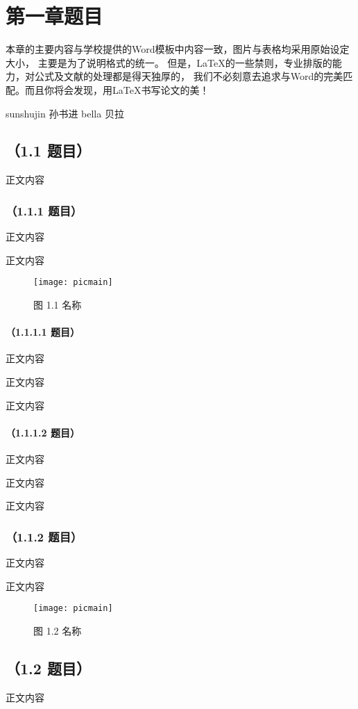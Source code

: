 \chapter{第一章题目}

本章的主要内容与学校提供的Word模板中内容一致，图片与表格均采用原始设定大小，%
主要是为了说明格式的统一。%
但是，\LaTeX{}的一些禁则，专业排版的能力，对公式及文献的处理都是得天独厚的，%
我们不必刻意去追求与Word的完美匹配。而且你将会发现，用\LaTeX{}书写论文的美！ %

sunshujin 孙书进
bella 贝拉

\section{（1.1 题目）}
正文内容

\subsection{（1.1.1 题目）}
正文内容

正文内容

\begin{figure}[htp]
\centering
\texttt{[image: picmain]}
\caption{图 1.1 名称}
\end{figure}

\subsubsection{（1.1.1.1 题目）}
正文内容

正文内容

正文内容

\subsubsection{（1.1.1.2 题目）}
正文内容

正文内容

正文内容

\subsection{（1.1.2 题目）}
正文内容

正文内容

\begin{figure}[htp]
\centering
\texttt{[image: picmain]}
\caption{图 1.2 名称}
\end{figure}

\section{（1.2 题目）}
正文内容

